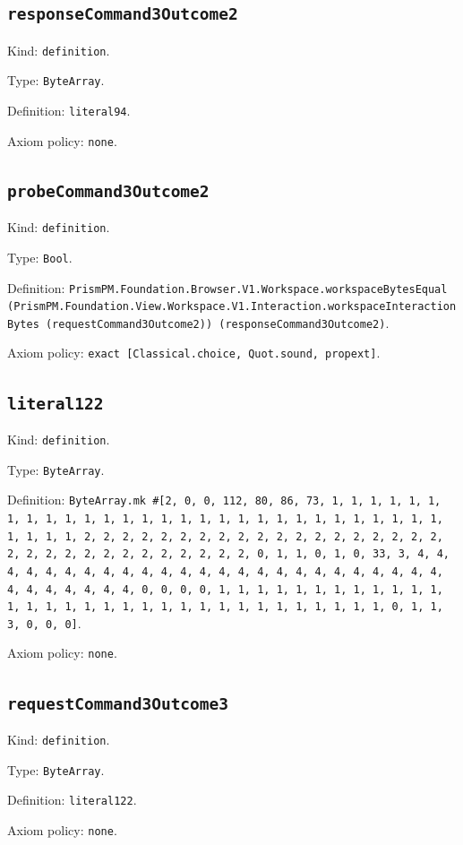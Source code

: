 \documentclass[11pt]{article}
\begin{document}
\subsection*{\texttt{responseCommand3Outcome2}}
\noindent Kind: \texttt{definition}.\par
\noindent Type: \texttt{ByteArray}.\par
\noindent Definition: \texttt{literal94}.\par
\noindent Axiom policy: \texttt{none}.\par
\subsection*{\texttt{probeCommand3Outcome2}}
\noindent Kind: \texttt{definition}.\par
\noindent Type: \texttt{Bool}.\par
\noindent Definition: \texttt{PrismPM.Foundation.Browser.V1.Workspace.workspaceBytesEqual (PrismPM.Foundation.View.Workspace.V1.Interaction.workspaceInteractionBytes (requestCommand3Outcome2)) (responseCommand3Outcome2)}.\par
\noindent Axiom policy: \texttt{exact [Classical.choice, Quot.sound, propext]}.\par
\subsection*{\texttt{literal122}}
\noindent Kind: \texttt{definition}.\par
\noindent Type: \texttt{ByteArray}.\par
\noindent Definition: \texttt{ByteArray.mk \#[2, 0, 0, 112, 80, 86, 73, 1, 1, 1, 1, 1, 1, 1, 1, 1, 1, 1, 1, 1, 1, 1, 1, 1, 1, 1, 1, 1, 1, 1, 1, 1, 1, 1, 1, 1, 1, 1, 1, 1, 2, 2, 2, 2, 2, 2, 2, 2, 2, 2, 2, 2, 2, 2, 2, 2, 2, 2, 2, 2, 2, 2, 2, 2, 2, 2, 2, 2, 2, 2, 2, 2, 0, 1, 1, 0, 1, 0, 33, 3, 4, 4, 4, 4, 4, 4, 4, 4, 4, 4, 4, 4, 4, 4, 4, 4, 4, 4, 4, 4, 4, 4, 4, 4, 4, 4, 4, 4, 4, 4, 4, 4, 0, 0, 0, 0, 1, 1, 1, 1, 1, 1, 1, 1, 1, 1, 1, 1, 1, 1, 1, 1, 1, 1, 1, 1, 1, 1, 1, 1, 1, 1, 1, 1, 1, 1, 1, 1, 0, 1, 1, 3, 0, 0, 0]}.\par
\noindent Axiom policy: \texttt{none}.\par
\subsection*{\texttt{requestCommand3Outcome3}}
\noindent Kind: \texttt{definition}.\par
\noindent Type: \texttt{ByteArray}.\par
\noindent Definition: \texttt{literal122}.\par
\noindent Axiom policy: \texttt{none}.\par
\end{document}
